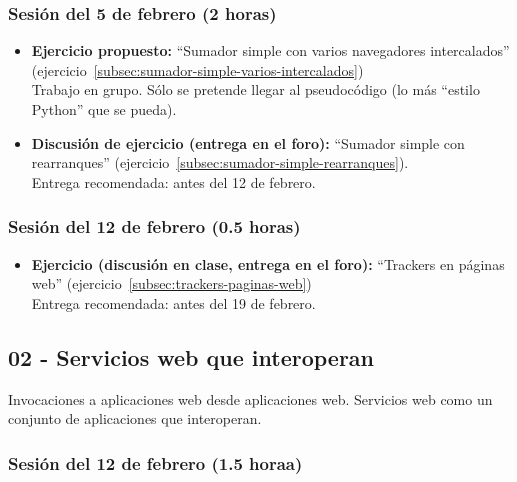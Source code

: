 \documentclass[a4paper,12pt]{article}
\begin{document}
\subsubsection{Sesión del 5 de febrero (2 horas)}

\begin{itemize}
\item \textbf{Ejercicio propuesto:} ``Sumador simple con varios 
navegadores intercalados'' (ejercicio~\ref{subsec:sumador-simple-varios-intercalados}) \\
  Trabajo en grupo. Sólo se pretende llegar al pseudocódigo (lo más ``estilo Python'' que se pueda).
\item \textbf{Discusión de ejercicio (entrega en el foro):} ``Sumador simple con rearranques'' (ejercicio~\ref{subsec:sumador-simple-rearranques}). \\
 Entrega recomendada: antes del 12 de febrero.
\end{itemize}

\subsubsection{Sesión del 12 de febrero (0.5 horas)}

\begin{itemize}
\item \textbf{Ejercicio (discusión en clase, entrega en el foro):} ``Trackers en páginas web'' (ejercicio~\ref{subsec:trackers-paginas-web})  \\
 Entrega recomendada: antes del 19 de febrero.
\end{itemize}


\subsection{02 - Servicios web que interoperan}

Invocaciones a aplicaciones web desde aplicaciones web. Servicios web como un conjunto de aplicaciones que interoperan.

\subsubsection{Sesión del 12 de febrero (1.5 horaa)}
\end{document}
